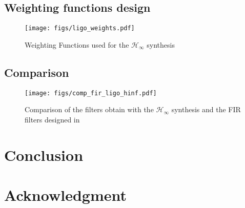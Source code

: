 \documentclass[9pt, technote, a4paper]{ieeeconf}
\begin{document}
\subsection{Weighting functions design}
\label{sec:orgdd7b46d}

\begin{figure}[htbp]
\centering
\texttt{[image: figs/ligo\_weights.pdf]}
\caption{\label{fig:ligo_weights}
Weighting Functions used for the \(\mathcal{H}_\infty\) synthesis}
\end{figure}

\subsection{Comparison}
\label{sec:orge13017e}

\begin{figure}[htbp]
\centering
\texttt{[image: figs/comp\_fir\_ligo\_hinf.pdf]}
\caption{\label{fig:comp_fir_ligo_hinf}
Comparison of the filters obtain with the \(\mathcal{H}_\infty\) synthesis and the FIR filters designed in \cite{hua05_low_ligo}}
\end{figure}

\section{Conclusion}
\label{sec:org7a21636}
\label{sec:conclusion}

\section{Acknowledgment}
\label{sec:org56fbb7d}


\end{document}
